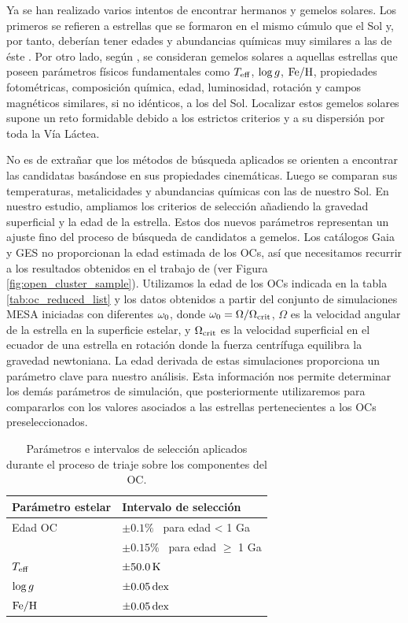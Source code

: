 Ya se han realizado varios intentos de encontrar hermanos y gemelos solares. Los primeros se refieren a estrellas que se formaron en el mismo cúmulo que el Sol y, por tanto, deberían tener edades y abundancias químicas muy similares a las de éste \citep[ver][y referencias en él]{Adibekyan2018}. Por otro lado, según \cite{Strobel1996}, se consideran gemelos solares a aquellas estrellas que poseen parámetros físicos fundamentales como $T_{\mathrm{eff}}$, $\mathrm{log} \, g$, $\mathrm{Fe}/\mathrm{H}$, propiedades fotométricas, composición química, edad, luminosidad, rotación y campos magnéticos similares, si no idénticos, a los del Sol. Localizar estos gemelos solares supone un reto formidable debido a los estrictos criterios y a su dispersión por toda la Vía Láctea.\par 

No es de extrañar que los métodos de búsqueda aplicados se orienten a encontrar las candidatas basándose en sus propiedades cinemáticas. Luego se comparan sus temperaturas, metalicidades y abundancias químicas con las de nuestro Sol. En nuestro estudio, ampliamos los criterios de selección añadiendo la gravedad superficial y la edad de la estrella. Estos dos nuevos parámetros representan un ajuste fino del proceso de búsqueda de candidatos a gemelos. Los catálogos Gaia y GES no proporcionan la edad estimada de los OCs, así que necesitamos recurrir a los resultados obtenidos en el trabajo de \cite{Bragaglia2022} (ver Figura \ref{fig:open_cluster_sample}). Utilizamos la edad de los OCs indicada en la tabla \ref{tab:oc_reduced_list} y los datos obtenidos a partir del conjunto de simulaciones MESA iniciadas con diferentes $\omega_{\mathrm{0}}$, donde $\omega_{\mathrm{0}} = \Omega / \Omega_{\mathrm{crit}}$, $\Omega$ es la velocidad angular de la estrella en la superficie estelar, y $\Omega_{\mathrm{crit}}$ es la velocidad superficial en el ecuador de una estrella en rotación donde la fuerza centrífuga equilibra la gravedad newtoniana. La edad derivada de estas simulaciones proporciona un parámetro clave para nuestro análisis. Esta información nos permite determinar los demás parámetros de simulación, que posteriormente utilizaremos para compararlos con los valores asociados a las estrellas pertenecientes a los OCs preseleccionados.\par

\begin{table}
	\centering
	\begin{tabular}{ll} 
		\hline
		Parámetro estelar & Intervalo de selección\\
		\hline
		Edad OC & $\pm0.1\%$ \, para edad < 1 Ga \\
		& $\pm0.15\%$ \, para edad $\geq$ 1 Ga \\
		$T_{\mathrm{eff}}$ & $\pm 50.0 \, \mathrm{K}$ \\
		$\mathrm{log} \, g$ & $\pm 0.05 \, \mathrm{dex}$\\
		$\mathrm{Fe}/\mathrm{H}$ & $\pm 0.05 \, \mathrm{dex}$\\
		\hline
	\end{tabular}
	\caption{Parámetros e intervalos de selección aplicados durante el proceso de triaje sobre los componentes del OC.}
	\label{tab:sel_params}
\end{table}

